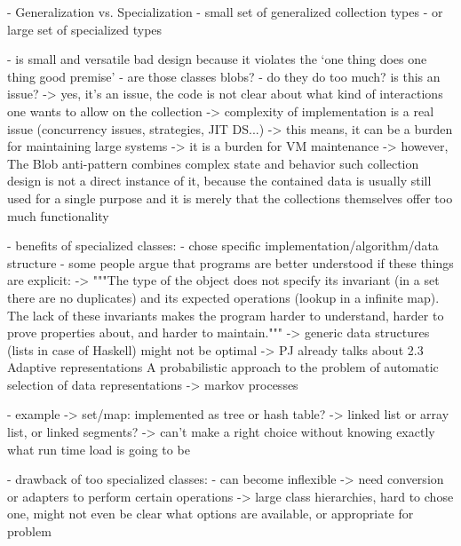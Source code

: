 \documentclass[sigconf, 10pt]{acmart}
\begin{document}
\begin{note}
  - Generalization vs. Specialization  
  - small set of generalized collection types 
  - or large set of specialized types
  
  - is small and versatile bad design because it violates the `one thing does   one thing good premise'
    - are those classes blobs? \citep{brown1998antipatterns}
    - do they do too much? is this an issue?
     -> yes, it's an issue, the code is not clear about what kind of 
        interactions one wants to allow on the collection
     -> complexity of implementation is a real issue (concurrency issues,
        strategies, JIT DS...)
     -> this means, it can be a burden for maintaining large systems
     -> it is a burden for VM maintenance
     -> however, The Blob anti-pattern combines complex state and behavior
        such collection design is not a direct instance of it, because
        the contained data is usually still used for a single purpose and
        it is merely that the collections themselves offer too much
        functionality

    - benefits of specialized classes:
      - chose specific implementation/algorithm/data structure
      - some people argue that programs are better understood if these things are explicit: \citep{PeytonJones:1996:BTC}
        -> """The type of the object does not specify its invariant (\eg in a set there are no duplicates) and its expected operations (\eg lookup in a infinite map). The lack of these invariants makes the program harder to understand, harder to prove properties about, and harder to maintain."""
        -> generic data structures (lists in case of Haskell) might not be optimal
         -> PJ already talks about 2.3 Adaptive representations
         A probabilistic approach to the problem of automatic selection of data representations \citep{Chuang:1996:PAP}
          -> markov processes

      - example
        -> set/map: implemented as tree or hash table?
        -> linked list or array list, or linked segments?
        -> can't make a right choice without knowing exactly what
           run time load is going to be

    - drawback of too specialized classes:
      - can become inflexible
        -> need conversion or adapters to perform certain operations
        -> large class hierarchies, hard to chose one, might not even be
           clear what options are available, or appropriate for problem
  
\end{note}
\end{document}
